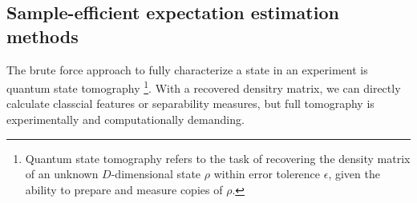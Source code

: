 \documentclass[
aps,
pra,
twocolumn,
floatfix,
]{revtex4-2}
\theoremstyle{plain}
\theoremstyle{definition}
\newtheorem{problem}{Problem}
\newcommand{\dm}{\rho}
\begin{document}

\subsection{Sample-efficient expectation estimation methods}\label{sec:estimation}
The brute force approach to fully characterize a state in an experiment is quantum state tomography \cite{altepeterPhotonicStateTomography2005}
\footnote{Quantum state tomography refers to the task of recovering the density matrix of an unknown $D$-dimensional state $\dm$ within error tolerence $\epsilon$, 
given the ability to prepare and measure copies of $\dm$.}.
With a recovered densitry matrix, we can directly calculate classcial features or separability measures,
but full tomography is experimentally and computationally demanding.
\end{document}
